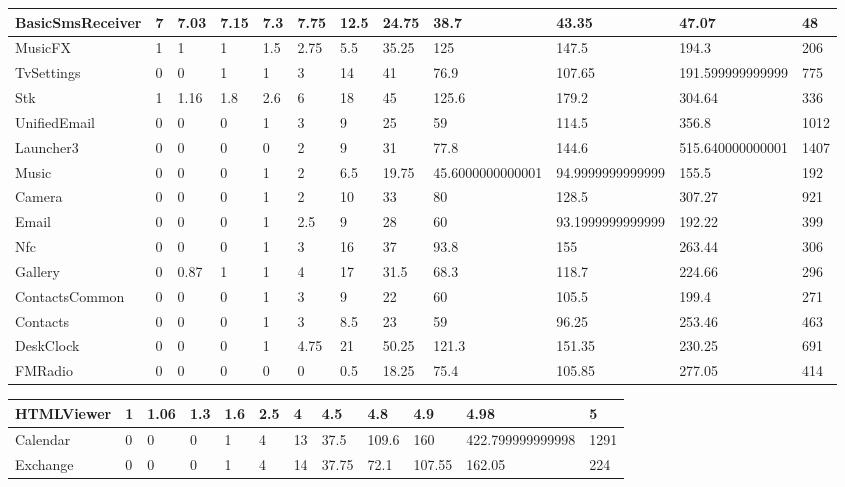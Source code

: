 \begin{tabular}{|l|l|l|l|l|l|l|l|l|l|l|l|}
\hline
BasicSmsReceiver&7&7.03&7.15&7.3&7.75&12.5&24.75&38.7&43.35&47.07&48\\
\hline
MusicFX&1&1&1&1.5&2.75&5.5&35.25&125&147.5&194.3&206\\
\hline
TvSettings&0&0&1&1&3&14&41&76.9&107.65&191.599999999999&775\\
\hline
Stk&1&1.16&1.8&2.6&6&18&45&125.6&179.2&304.64&336\\
\hline
UnifiedEmail&0&0&0&1&3&9&25&59&114.5&356.8&1012\\
\hline
Launcher3&0&0&0&0&2&9&31&77.8&144.6&515.640000000001&1407\\
\hline
Music&0&0&0&1&2&6.5&19.75&45.6000000000001&94.9999999999999&155.5&192\\
\hline
Camera&0&0&0&1&2&10&33&80&128.5&307.27&921\\
\hline
Email&0&0&0&1&2.5&9&28&60&93.1999999999999&192.22&399\\
\hline
Nfc&0&0&0&1&3&16&37&93.8&155&263.44&306\\
\hline
Gallery&0&0.87&1&1&4&17&31.5&68.3&118.7&224.66&296\\
\hline
ContactsCommon&0&0&0&1&3&9&22&60&105.5&199.4&271\\
\hline
Contacts&0&0&0&1&3&8.5&23&59&96.25&253.46&463\\
\hline
DeskClock&0&0&0&1&4.75&21&50.25&121.3&151.35&230.25&691\\
\hline
FMRadio&0&0&0&0&0&0.5&18.25&75.4&105.85&277.05&414\\
\hline
\end{tabular}
\newline
\begin{tabular}{|l|l|l|l|l|l|l|l|l|l|l|l|}
\hline
HTMLViewer&1&1.06&1.3&1.6&2.5&4&4.5&4.8&4.9&4.98&5\\
\hline
Calendar&0&0&0&1&4&13&37.5&109.6&160&422.799999999998&1291\\
\hline
Exchange&0&0&0&1&4&14&37.75&72.1&107.55&162.05&224\\
\hline
\end{tabular}
